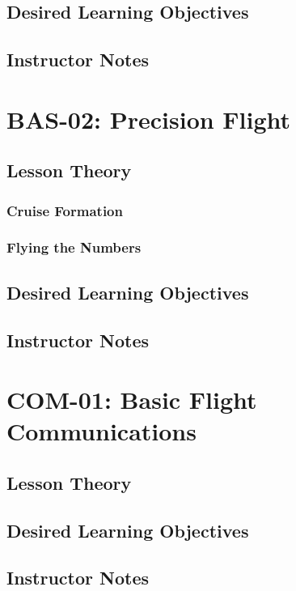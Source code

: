     \section{Desired Learning Objectives}
    \section{Instructor Notes}

  \chapter{BAS-02: Precision Flight}
    \section{Lesson Theory}
      \subsection{Cruise Formation}
      \subsection{Flying the Numbers}
    \section{Desired Learning Objectives}
    \section{Instructor Notes}

  \chapter{COM-01: Basic Flight Communications}
    \section{Lesson Theory}
    \section{Desired Learning Objectives}
    \section{Instructor Notes}